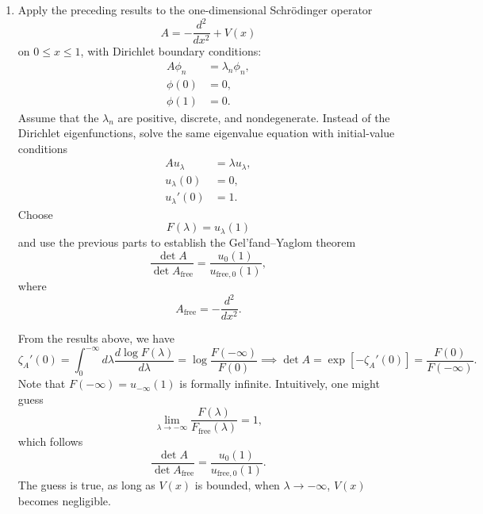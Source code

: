 \begin{enumerate}[label=\alph*)]
    \item Apply the preceding results to the one-dimensional Schr\"odinger
    operator
    \begin{equation}
        A=-\frac{d^2}{dx^2}+V(x)
    \end{equation}
    on $0\leq x\leq1$, with Dirichlet boundary conditions:
    \begin{equation}
        \begin{aligned}
            A\phi_n&=\lambda_n\phi_n,\\
            \phi(0)&=0,\\
            \phi(1)&=0.
        \end{aligned}
    \end{equation}
    Assume that the $\lambda_n$ are positive, discrete, and nondegenerate.
    Instead of the Dirichlet eigenfunctions, solve the same eigenvalue equation
    with initial-value conditions
    \begin{equation}
        \begin{aligned}
            Au_\lambda&=\lambda u_\lambda,\\
            u_\lambda(0)&=0,\\
            u_\lambda'(0)&=1.
        \end{aligned}
    \end{equation}
    Choose
    \begin{equation}
        F(\lambda)=u_\lambda(1)
    \end{equation}
    and use the previous parts to establish the Gel'fand--Yaglom theorem
    \begin{equation}
        \frac{\det A}{\det A_{\mathrm{free}}}
        =\frac{u_0(1)}{u_{\mathrm{free},0}(1)},
    \end{equation}
    where
    \begin{equation}
        A_{\mathrm{free}}=-\frac{d^2}{dx^2}.
    \end{equation}
    \begin{solution}
        From the results above, we have
        \begin{equation}
            \zeta_A'(0) = \int^{-\infty}_0d\lambda \frac{d\log F(\lambda)}{d\lambda} = \log\frac{F(-\infty)}{F(0)} \implies \det A = \exp [-\zeta_A'(0)] = \frac{F(0)}{F(-\infty)}.
        \end{equation}
        Note that $F(-\infty) = u_{-\infty}(1)$ is formally infinite. Intuitively, one might guess
        \begin{equation}
            \lim_{\lambda\to -\infty}\frac{F(\lambda)}{F_\mathrm{free}(\lambda)} = 1,
        \end{equation}
        which follows
        \begin{equation}
            \frac{\det A}{\det A_{\mathrm{free}}}
        =\frac{u_0(1)}{u_{\mathrm{free},0}(1)}.
        \end{equation}
        The guess is true, as long as $V(x)$ is bounded, when $\lambda \to -\infty$, $V(x)$ becomes negligible.
    \end{solution}


\end{enumerate}
